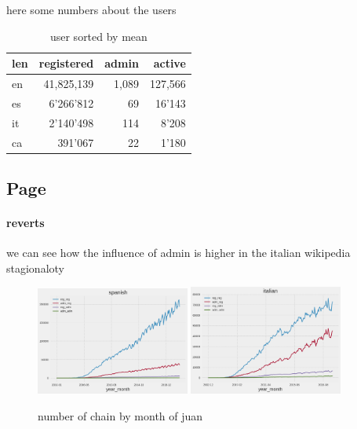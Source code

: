 here some numbers about the users 
\begin{table}[H]
    \centering
    \begin{tabularx}{\columnwidth}{@{}Xrrr@{}}
        \midrule
        \textbf{len}& \textbf{registered} & \textbf{admin}& \textbf{active}  \\ \toprule
        en& 41,825,139& 1,089& 127,566  \\
        es & 6'266'812 & 69 & 16'143   \\
        it & 2'140'498 & 114 & 8'208\\
        ca & 391'067 & 22 & 1'180   \\
     

        
         \bottomrule
    \end{tabularx}
    
    \caption{user sorted by mean \label{table:statsuser}}
\end{table}

\subsection{Page}
\paragraph*{reverts}
we can see how the influence of admin is higher in the italian wikipedia stagionaloty
\begin{figure}[H]
    \centering
    \includegraphics[width=0.45\textwidth]{./chapters/04/assets/admin_es.png}
    \includegraphics[width=0.45\textwidth]{./chapters/04/assets/admin_it.png}
    \caption{number of chain by month of juan}
    \label{fig:compare}
\end{figure}
